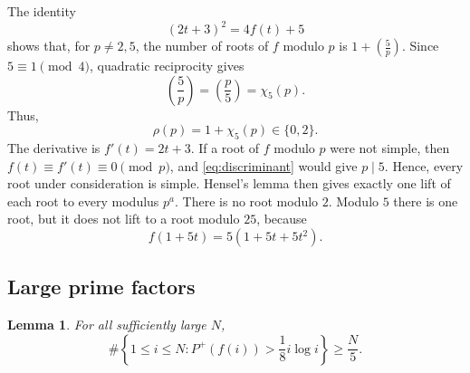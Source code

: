 \documentclass[11pt]{amsart}
\newtheorem{lemma}[theorem]{Lemma}
\theoremstyle{definition}
\theoremstyle{remark}
\begin{document}
The identity
\begin{equation}\label{eq:discriminant}
(2t+3)^2=4f(t)+5
\end{equation}
shows that, for $p\neq2,5$, the number of roots of $f$ modulo $p$ is
$1+\left(\frac5p\right)$.  Since $5\equiv1\pmod4$, quadratic reciprocity
gives
\[
\left(\frac5p\right)=\left(\frac p5\right)=\chi_5(p).
\]
Thus,
\begin{equation}\label{eq:rho}
\rho(p)=1+\chi_5(p)\in\{0,2\}.
\end{equation}
The derivative is $f'(t)=2t+3$.  If a root of $f$ modulo $p$ were not simple,
then $f(t)\equiv f'(t)\equiv0\pmod p$, and \eqref{eq:discriminant} would give
$p\mid5$.  Hence, every root under consideration is simple.  Hensel's lemma
then gives exactly one lift of each root to every modulus $p^a$.  There is no
root modulo $2$.  Modulo $5$ there is one root, but it does not lift to a root
modulo $25$, because
\begin{equation}\label{eq:five}
f(1+5t)=5(1+5t+5t^2).
\end{equation}

\subsection{Large prime factors}

\begin{lemma}\label{lem:largeprime}
For all sufficiently large $N$,
\[
\#\left\{1\leq i\leq N:P^+(f(i))>\frac18 i\log i\right\}\geq\frac N5.
\]
\end{lemma}
\end{document}
